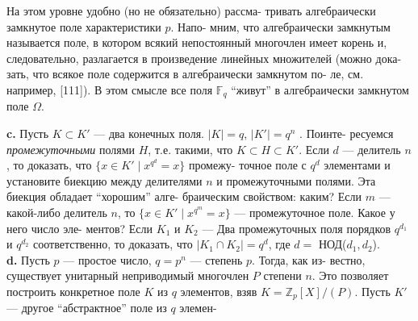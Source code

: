 \documentclass{mai_book}
\begin{document}
\begin{mynotice}
На этом уровне удобно (но не обязательно) рассма-\linebreak
тривать алгебраически замкнутое поле характеристики $p$. Напо-\linebreak
мним, что алгебраически замкнутым называется поле, в котором\linebreak
всякий непостоянный многочлен имеет корень и, следовательно,\linebreak
разлагается в произведение линейных множителей (можно дока-\linebreak
зать, что всякое поле содержится в алгебраически замкнутом по-\linebreak
ле, см. например, [111]). В этом смысле все поля $\mathbb{F}_q$ “живут” в\linebreak
алгебраически замкнутом поле  $\Omega$.
\end{mynotice}
\hspace*{10pt}\textbf{c.} Пусть $K\subset K'$ — два конечных поля. $|K|=q$, $|K'| = q^n$ . Поинте-\linebreak
ресуемся \textit{промежуточными} полями $H$, т.е. такими, что $K\subset H\subset K'$.\linebreak
Если $d$ — делитель $n$, то доказать, что $\{x\in K'\;|\;x^{q^d}=x\}$ промежу-\linebreak
точное поле с $q^d$ элементами и установите биекцию между делителями\linebreak
$n$ и промежуточными полями. Эта биекция обладает “хорошим” алге-\linebreak
браическим свойством: каким? Если $m$ — какой-либо делитель $n$, то\linebreak
$\{x\in K'\;|\;x^{q^m}=x\}$ — промежуточное поле. Какое у него число эле-\linebreak
ментов? Если $K_1$ и $K_2$ — Два промежуточных поля порядков $q^{d_1}$ и $q^{d_2}$\linebreak
соответственно, то доказать, что $|K_1\cap K_2| = q^d$, где $d =$ НОД($d_1,d_2$).
\\
\hspace*{10pt}\textbf{d.} Пусть $p$ — простое число, $q = p^n$ — степень $p$. Тогда, как из-\linebreak
вестно, существует унитарный неприводимый многочлен $P$ степени\linebreak
$n$. Это позволяет построить конкретное поле $K$ из $q$ элементов, взяв\linebreak
$K=\mathbb{Z}_p[X]/(P)$. Пусть $K'$ — другое “абстрактное” поле из $q$ элемен-\linebreak
\end{document}
